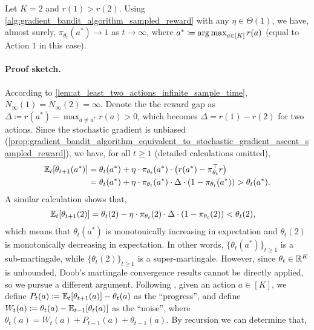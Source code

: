 \begin{theorem}
\label{thm:two_action_global_convergence}
Let $K = 2$ and $r(1) > r(2)$. Using \cref{alg:gradient_bandit_algorithm_sampled_reward} with any $\eta \in \Theta(1)$, we have, almost surely, $\pi_{\theta_t}(a^*) \to 1$ as $t \to \infty$, where $a^* \coloneqq \operatorname*{arg\,max}_{a \in [K]}{ r(a) }$ (equal to Action $1$ in this case).
\end{theorem}
\paragraph{Proof sketch.} According to \cref{lem:at_least_two_actions_infinite_sample_time}, $N_\infty(1) = N_\infty(2) = \infty$. Denote the the reward gap as $\Delta \coloneqq r(a^*) - \max_{a \not= a^*}{ r(a) } > 0$, which becomes $\Delta = r(1) - r(2)$ for two actions. Since the stochastic gradient is unbiased (\cref{prop:gradient_bandit_algorithm_equivalent_to_stochastic_gradient_ascent_sampled_reward}), we have, for all $t \ge 1$ (detailed calculations omitted),
\begin{align}
\label{eq:two_action_case_optimal_action_param_submartingale_a}
    \mathbb{E}_t[\theta_{t+1}(a^*)] &= \theta_t(a^*) + \eta \cdot \pi_{\theta_t}(a^*) \cdot \left(  r(a^*) - \pi_{\theta_t}^\top r \right) \\
\label{eq:two_action_case_optimal_action_param_submartingale_b}
    &= \theta_t(a^*) + \eta \cdot \pi_{\theta_t}(a^*) \cdot \Delta \cdot \left( 1 - \pi_{\theta_t}(a^*) \right) > \theta_t(a^*).
\end{align}
A similar calculation shows that,
\begin{align}
\label{eq:two_action_case_suboptimal_action_param_supermartingale}
    \mathbb{E}_t[\theta_{t+1}(2)] = \theta_t(2) - \eta \cdot \pi_{\theta_t}(2) \cdot \Delta \cdot \left( 1 - \pi_{\theta_t}(2) \right) &< \theta_t(2),
\end{align}
which means that $\theta_t(a^*)$ is monotonically increasing in expectation and $\theta_t(2)$ is monotonically decreasing in expectation. In other words, $\{ \theta_t(a^*) \}_{t \ge 1}$ is a sub-martingale, while $\{ \theta_t(2) \}_{t \ge 1}$ is a  super-martingale. However, since $\theta_t \in {\mathbb{R}}^K$ is unbounded, Doob's martingale convergence results cannot be directly applied, so we pursue a different argument. Following \citep{mei2022role,mei2024stochastic}, given an action $a \in [K]$, we define $P_t(a) \coloneqq \mathbb{E}_t[\theta_{t+1}(a)] -\theta_t(a) $ as the ``progress'', and define $W_t(a) \coloneqq \theta_t(a) - \mathbb{E}_{t-1}{[ \theta_t(a)]}$ as the ``noise'', where $\theta_{t}(a) = W_t(a) + P_{t-1}(a) + \theta_{t-1}(a)$.  By recursion we can determine that,
